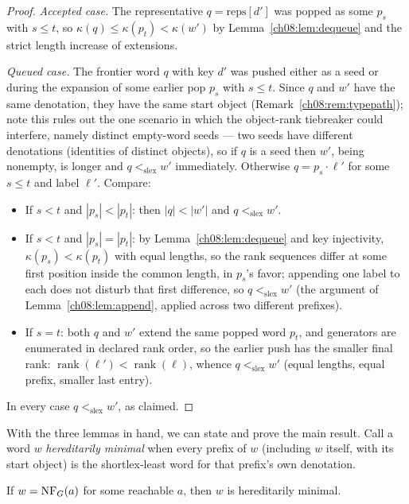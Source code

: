 \begin{proof}
\emph{Accepted case.} The representative $q=\text{reps}[d']$ was popped as
some $p_s$ with $s\le t$, so $\kappa(q)\le\kappa(p_t)<\kappa(w')$ by
Lemma~\ref{ch08:lem:dequeue} and the strict length increase of extensions.

\emph{Queued case.} The frontier word $q$ with key $d'$ was pushed either as
a seed or during the expansion of some earlier pop $p_s$ with $s\le t$.
Since $q$ and $w'$ have the same denotation, they have the same start object
(Remark~\ref{ch08:rem:typepath}); note this rules out the one scenario in
which the object-rank tiebreaker could interfere, namely distinct empty-word
seeds --- two seeds have different denotations (identities of distinct
objects), so if $q$ is a seed then $w'$, being nonempty, is longer and
$q<_{\mathrm{slex}}w'$ immediately. Otherwise $q=p_s\cdot\ell'$ for some
$s\le t$ and label $\ell'$. Compare:
\begin{itemize}
\item If $s<t$ and $|p_s|<|p_t|$: then $|q|<|w'|$ and $q<_{\mathrm{slex}}w'$.
\item If $s<t$ and $|p_s|=|p_t|$: by Lemma~\ref{ch08:lem:dequeue} and key
  injectivity, $\kappa(p_s)<\kappa(p_t)$ with equal lengths, so the rank
  sequences differ at some first position inside the common length, in
  $p_s$'s favor; appending one label to each does not disturb that first
  difference, so $q<_{\mathrm{slex}}w'$ (the argument of
  Lemma~\ref{ch08:lem:append}, applied across two different prefixes).
\item If $s=t$: both $q$ and $w'$ extend the same popped word $p_t$, and
  generators are enumerated in declared rank order, so the earlier push has
  the smaller final rank: $\operatorname{rank}(\ell')<\operatorname{rank}(\ell)$,
  whence $q<_{\mathrm{slex}}w'$ (equal lengths, equal prefix, smaller last
  entry).
\end{itemize}
In every case $q<_{\mathrm{slex}}w'$, as claimed.
\end{proof}

With the three lemmas in hand, we can state and prove the main result. Call
a word $w$ \emph{hereditarily minimal} when every prefix of $w$ (including
$w$ itself, with its start object) is the shortlex-least word for that
prefix's own denotation.

\begin{lemma}\label{ch08:lem:hereditary}
If $w=\mathrm{NF}_G(a)$ for some reachable $a$, then $w$ is hereditarily minimal.
\end{lemma}

